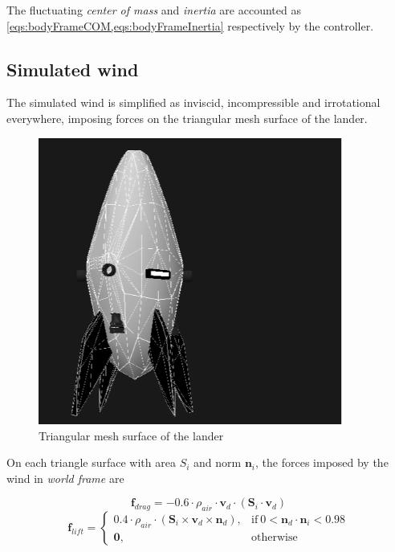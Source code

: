 \documentclass[10pt]{elsarticle}
\begin{document}
The fluctuating \textit{center of mass} and \textit{inertia} are accounted as \cref{eqs:bodyFrameCOM,eqs:bodyFrameInertia} respectively by the controller.

\subsection{Simulated wind} \label{sec:windsim}
The simulated wind is simplified as inviscid, incompressible and irrotational everywhere, imposing forces on the triangular mesh surface of the lander. 

\begin{figure}[!ht]
    \centering
    \includegraphics[width=10.0cm, keepaspectratio]{WindSimMesh}
    \vspace*{3mm}
    \caption{Triangular mesh surface of the lander}
    \label{fig:WindSimMesh}
\end{figure}

On each triangle surface with area $S_i$ and norm $\boldsymbol{n}_i$, the forces imposed by the wind in \textit{world frame} are

\footnotesize
\[
\boldsymbol{f}_{drag} = - 0.6 \cdot \rho_{air} \cdot \boldsymbol{v}_{d} \cdot (\boldsymbol{S}_i \cdot \boldsymbol{v}_{d})   
\]
\[
\boldsymbol{f}_{lift} = \begin{cases}
                              0.4 \cdot \rho_{air} \cdot (\boldsymbol{S}_i \times \boldsymbol{v}_{d} \times \boldsymbol{n}_{d}), & \text{if}\ 0 < \boldsymbol{n}_{d} \cdot \boldsymbol{n}_i < 0.98 \\
                              \boldsymbol{0}, & \text{otherwise}
                        \end{cases}
\]
\normalsize
\end{document}

